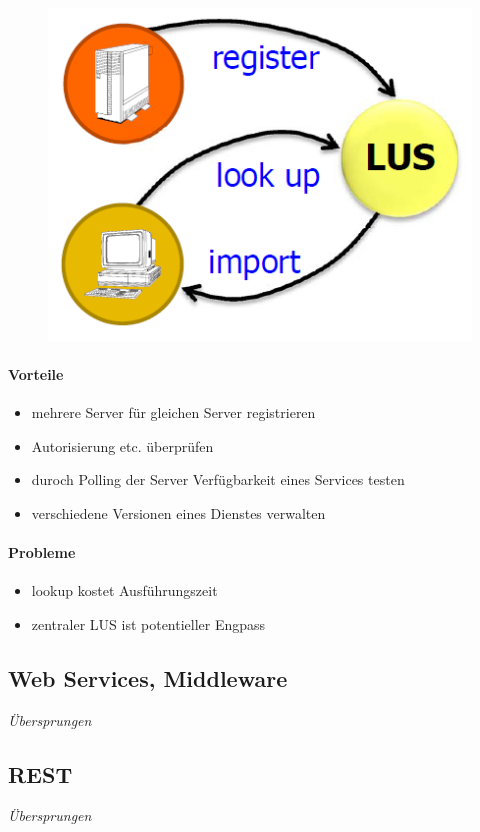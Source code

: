 \documentclass[10pt,a4paper]{article}
\begin{document}
\begin{figure}[h]
\includegraphics[scale=0.3]{./Bilder/Lookup-Service}
\end{figure}

\paragraph{Vorteile}
\begin{itemize}
\item mehrere Server für gleichen Server registrieren
\item Autorisierung etc. überprüfen
\item duroch Polling der Server Verfügbarkeit eines Services testen
\item verschiedene Versionen eines Dienstes verwalten
\end{itemize}
\paragraph{Probleme}
\begin{itemize}
\item lookup kostet Ausführungszeit
\item zentraler LUS ist potentieller Engpass
\end{itemize}

\subsection{Web Services, Middleware}
\textit{Übersprungen}

\subsection{REST}
\textit{Übersprungen}
\end{document}
